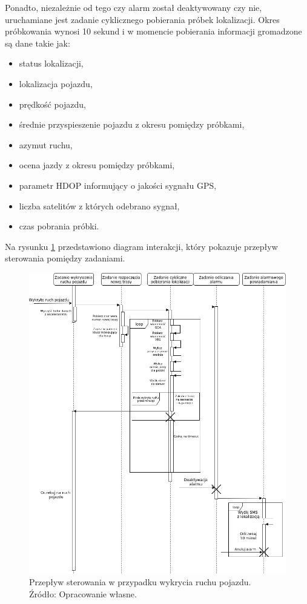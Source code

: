 Ponadto, niezależnie od tego czy alarm został deaktywowany czy nie, uruchamiane jest zadanie cyklicznego pobierania próbek lokalizacji. Okres próbkowania wynosi 10 sekund i w momencie pobierania informacji gromadzone są dane takie jak:

\begin{itemize}
\item status lokalizacji,
\item lokalizacja pojazdu,
\item prędkość pojazdu,
\item średnie przyspieszenie pojazdu z okresu pomiędzy próbkami,
\item azymut ruchu,
\item ocena jazdy z okresu pomiędzy próbkami,
\item parametr HDOP informujący o jakości sygnału GPS,
\item liczba satelitów z których odebrano sygnał,
\item czas pobrania próbki.
\end{itemize}

Na rysunku \ref{fig:image_soft_mainboard_control_flow} przedstawiono diagram interakcji, który pokazuje przepływ sterowania pomiędzy zadaniami. 


\begin{figure}[H]
	\centering
	\includegraphics[width=17cm]{img/software/mainboard/MainBoardStartTracking.jpg}
	\caption{Przepływ sterowania w przypadku wykrycia ruchu pojazdu. 
	\\Źródło: Opracowanie własne.}
	\label{fig:image_soft_mainboard_control_flow}
\end{figure}